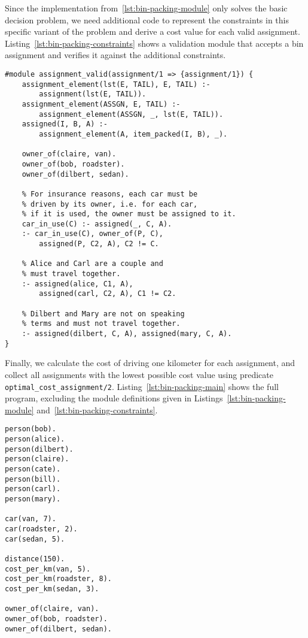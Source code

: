 \begin{example}
Since the implementation from~\ref{lst:bin-packing-module} only solves the basic decision problem, we need additional code to represent the constraints in this specific variant of the problem and derive a cost value for each valid assignment. Listing~\ref{lst:bin-packing-constraints} shows a validation module that accepts a bin assignment and verifies it against the additional constraints.
\begin{lstlisting}[style=asp-code, label={lst:bin-packing-constraints}, caption={Custom Constraints}]
#module assignment_valid(assignment/1 => {assignment/1}) {
	assignment_element(lst(E, TAIL), E, TAIL) :- 
		assignment(lst(E, TAIL)).
	assignment_element(ASSGN, E, TAIL) :- 
		assignment_element(ASSGN, _, lst(E, TAIL)).
	assigned(I, B, A) :- 
		assignment_element(A, item_packed(I, B), _).
	
	owner_of(claire, van).
	owner_of(bob, roadster).
	owner_of(dilbert, sedan).
	
	% For insurance reasons, each car must be 
	% driven by its owner, i.e. for each car, 
	% if it is used, the owner must be assigned to it.
	car_in_use(C) :- assigned(_, C, A).
	:- car_in_use(C), owner_of(P, C), 
		assigned(P, C2, A), C2 != C.
	
	% Alice and Carl are a couple and 
	% must travel together.
	:- assigned(alice, C1, A), 
		assigned(carl, C2, A), C1 != C2.
	
	% Dilbert and Mary are not on speaking 
	% terms and must not travel together.
	:- assigned(dilbert, C, A), assigned(mary, C, A).
}	
\end{lstlisting}	
Finally, we calculate the cost of driving one kilometer for each assignment, and collect all assignments with the lowest possible cost value using predicate \texttt{optimal\_cost\_assignment/2}.
Listing~\ref{lst:bin-packing-main} shows the full program, excluding the module definitions given in Listings~\ref{lst:bin-packing-module} and~\ref{lst:bin-packing-constraints}.
\begin{lstlisting}[style=asp-code, label={lst:bin-packing-main}, caption={Main Program}]
person(bob).
person(alice).
person(dilbert).
person(claire).
person(cate).
person(bill).
person(carl).
person(mary).

car(van, 7).
car(roadster, 2).
car(sedan, 5).

distance(150).
cost_per_km(van, 5).
cost_per_km(roadster, 8).
cost_per_km(sedan, 3).

owner_of(claire, van).
owner_of(bob, roadster).
owner_of(dilbert, sedan).


\end{lstlisting}
\end{example}
